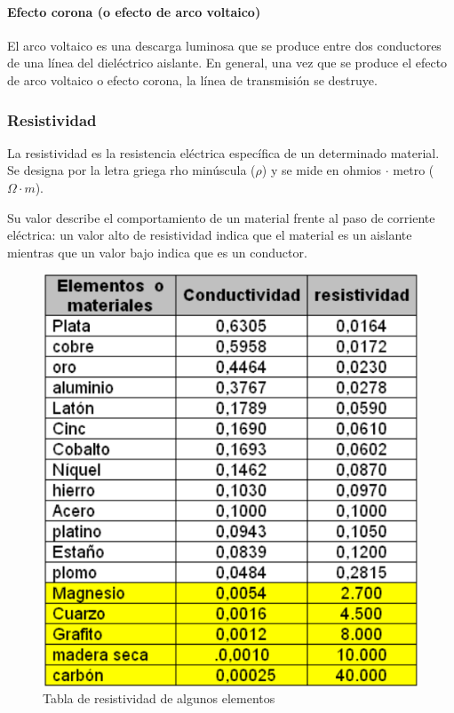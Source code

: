            \paragraph{Efecto corona (o efecto de arco voltaico)}

                El arco voltaico es una descarga luminosa que se produce entre dos conductores de una línea del dieléctrico aislante. En general, una vez que se produce el efecto de arco voltaico o efecto corona, la línea de transmisión se destruye.


        \subsubsection{Resistividad}

            La resistividad es la resistencia eléctrica específica de un determinado material. Se designa por la letra griega rho minúscula ($\rho$) y se mide en ohmios $\cdot$ metro ($\Omega \cdot m$).

            Su valor describe el comportamiento de un material frente al paso de corriente eléctrica: un valor alto de resistividad indica que el material es un aislante mientras que un valor bajo indica que es un conductor.

            \begin{figure}[H]
                \centering
                \includegraphics[width=0.5\linewidth]{imagenes/resistividad.png}
                \caption{Tabla de resistividad de algunos elementos}
                \label{fig:resistividad}
            \end{figure}










                
\newpage